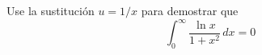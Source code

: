 \item Use la sustitución $u = 1/x$ para demostrar que
    \[ \int_{0}^{\infty} \frac{\ln x}{1 + x^2} \, dx = 0 \]
